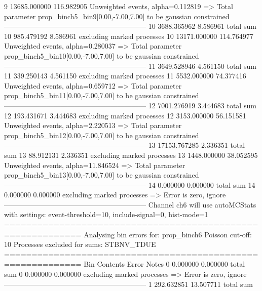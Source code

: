 9          13685.000000    116.982905      Unweighted events, alpha=0.112819
  => Total parameter prop_binch5_bin9[0.00,-7.00,7.00] to be gaussian constrained
------------------------------------------------------------
10         3688.365962     8.586961        total sum                     
10         985.479192      8.586961        excluding marked processes    
10         13171.000000    114.764977      Unweighted events, alpha=0.280037
  => Total parameter prop_binch5_bin10[0.00,-7.00,7.00] to be gaussian constrained
------------------------------------------------------------
11         3649.528946     4.561150        total sum                     
11         339.250143      4.561150        excluding marked processes    
11         5532.000000     74.377416       Unweighted events, alpha=0.659712
  => Total parameter prop_binch5_bin11[0.00,-7.00,7.00] to be gaussian constrained
------------------------------------------------------------
12         7001.276919     3.444683        total sum                     
12         193.431671      3.444683        excluding marked processes    
12         3153.000000     56.151581       Unweighted events, alpha=2.220513
  => Total parameter prop_binch5_bin12[0.00,-7.00,7.00] to be gaussian constrained
------------------------------------------------------------
13         17153.767285    2.336351        total sum                     
13         88.912131       2.336351        excluding marked processes    
13         1448.000000     38.052595       Unweighted events, alpha=11.846524
  => Total parameter prop_binch5_bin13[0.00,-7.00,7.00] to be gaussian constrained
------------------------------------------------------------
14         0.000000        0.000000        total sum                     
14         0.000000        0.000000        excluding marked processes    
  => Error is zero, ignore      
------------------------------------------------------------
Channel ch6 will use autoMCStats with settings: event-threshold=10, include-signal=0, hist-mode=1
============================================================
Analysing bin errors for: prop_binch6
Poisson cut-off: 10
Processes excluded for sums: STBNV_TDUE
============================================================
Bin        Contents        Error           Notes                         
0          0.000000        0.000000        total sum                     
0          0.000000        0.000000        excluding marked processes    
  => Error is zero, ignore      
------------------------------------------------------------
1          292.632851      13.507711       total sum                     
